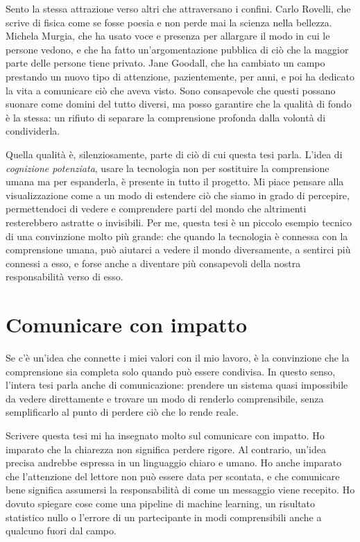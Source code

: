 Sento la stessa attrazione verso altri che attraversano i confini. Carlo Rovelli, che scrive di fisica come se fosse poesia e non perde mai la scienza nella bellezza. Michela Murgia, che ha usato voce e presenza per allargare il modo in cui le persone vedono, e che ha fatto un'argomentazione pubblica di ciò che la maggior parte delle persone tiene privato. Jane Goodall, che ha cambiato un campo prestando un nuovo tipo di attenzione, pazientemente, per anni, e poi ha dedicato la vita a comunicare ciò che aveva visto. Sono consapevole che questi possano suonare come domini del tutto diversi, ma posso garantire che la qualità di fondo è la stessa: un rifiuto di separare la comprensione profonda dalla volontà di condividerla.

Quella qualità è, silenziosamente, parte di ciò di cui questa tesi parla. L'idea di \emph{cognizione potenziata}, usare la tecnologia non per sostituire la comprensione umana ma per espanderla, è presente in tutto il progetto. Mi piace pensare alla visualizzazione come a un modo di estendere ciò che siamo in grado di percepire, permettendoci di vedere e comprendere parti del mondo che altrimenti resterebbero astratte o invisibili. Per me, questa tesi è un piccolo esempio tecnico di una convinzione molto più grande: che quando la tecnologia è connessa con la comprensione umana, può aiutarci a vedere il mondo diversamente, a sentirci più connessi a esso, e forse anche a diventare più consapevoli della nostra responsabilità verso di esso.

\section{Comunicare con impatto}
\label{sec:impact}

Se c'è un'idea che connette i miei valori con il mio lavoro, è la convinzione che la comprensione sia completa solo quando può essere condivisa. In questo senso, l'intera tesi parla anche di comunicazione: prendere un sistema quasi impossibile da vedere direttamente e trovare un modo di renderlo comprensibile, senza semplificarlo al punto di perdere ciò che lo rende reale.

Scrivere questa tesi mi ha insegnato molto sul comunicare con impatto. Ho imparato che la chiarezza non significa perdere rigore. Al contrario, un'idea precisa andrebbe espressa in un linguaggio chiaro e umano. Ho anche imparato che l'attenzione del lettore non può essere data per scontata, e che comunicare bene significa assumersi la responsabilità di come un messaggio viene recepito. Ho dovuto spiegare cose come una pipeline di machine learning, un risultato statistico nullo o l'errore di un partecipante in modi comprensibili anche a qualcuno fuori dal campo.

